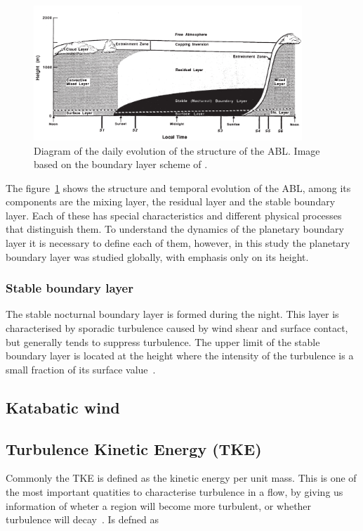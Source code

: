 \documentclass[a4paper,12pt]{article}
\begin{document}
\begin{figure}[ht!]
	\vspace{-5pt}
    \centering
\includegraphics[width=0.9\textwidth]{fig/abl_stull.png}
    \caption{Diagram of the daily evolution of the structure of the ABL. Image based on the boundary layer scheme of \cite{stull2012introduction}.}
    \label{fig:ABL_structure}
  \vspace{-5pt}
\end{figure}

The figure~\ref{fig:ABL_structure} shows the structure and temporal evolution of the ABL, among its components are the mixing layer, the residual layer and the stable boundary layer. Each of these has special characteristics and different physical processes that distinguish them. To understand the dynamics of the planetary boundary layer it is necessary to define each of them, however, in this study the planetary boundary layer was studied globally, with emphasis only on its height.

\subsubsection{Stable boundary layer}
The stable nocturnal boundary layer is formed during the night. This layer is characterised by sporadic turbulence caused by wind shear and surface contact, but generally tends to suppress turbulence. The upper limit of the stable boundary layer is located at the height where the intensity of the turbulence is a small fraction of its surface value~\citep{stull2012introduction}.


\subsection{Katabatic wind}

\subsection{Turbulence Kinetic Energy (TKE)}
Commonly the TKE is defined as the kinetic energy per unit mass. This is one of the most important quatities to characterise turbulence in a flow, by giving us information of wheter a region will become more turbulent, or whether turbulence will decay~\citep{stull2012introduction}.  Is defned as 
\end{document}
